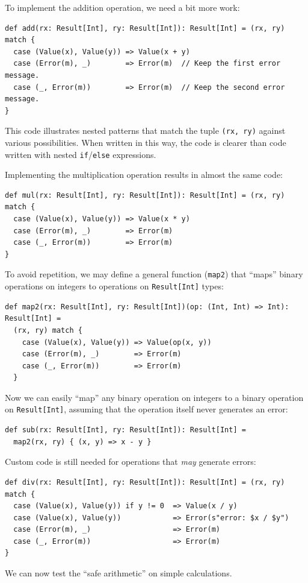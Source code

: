 To implement the addition operation, we need a bit more work:
\begin{lstlisting}
def add(rx: Result[Int], ry: Result[Int]): Result[Int] = (rx, ry) match {
  case (Value(x), Value(y)) => Value(x + y)
  case (Error(m), _)        => Error(m)  // Keep the first error message.
  case (_, Error(m))        => Error(m)  // Keep the second error message.
}
\end{lstlisting}
This code illustrates nested patterns that match the tuple \lstinline!(rx, ry)!
against various possibilities. When written in this way, the code
is clearer than code written with nested \lstinline!if!/\lstinline!else!
expressions.

Implementing the multiplication operation results in almost the same
code:
\begin{lstlisting}
def mul(rx: Result[Int], ry: Result[Int]): Result[Int] = (rx, ry) match {
  case (Value(x), Value(y)) => Value(x * y)
  case (Error(m), _)        => Error(m)
  case (_, Error(m))        => Error(m)
}
\end{lstlisting}
To avoid repetition, we may define a general function (\lstinline!map2!)
that \textsf{``}maps\textsf{''} binary operations on integers to operations on \lstinline!Result[Int]!
types:
\begin{lstlisting}
def map2(rx: Result[Int], ry: Result[Int])(op: (Int, Int) => Int): Result[Int] =
  (rx, ry) match {
    case (Value(x), Value(y)) => Value(op(x, y))
    case (Error(m), _)        => Error(m)
    case (_, Error(m))        => Error(m)
  }
\end{lstlisting}
Now we can easily \textsf{``}map\textsf{''} any binary operation on integers to a
binary operation on \lstinline!Result[Int]!, assuming that the operation
itself never generates an error:
\begin{lstlisting}
def sub(rx: Result[Int], ry: Result[Int]): Result[Int] =
  map2(rx, ry) { (x, y) => x - y }
\end{lstlisting}
 Custom code is still needed for operations that \emph{may} generate
errors:
\begin{lstlisting}
def div(rx: Result[Int], ry: Result[Int]): Result[Int] = (rx, ry) match {
  case (Value(x), Value(y)) if y != 0  => Value(x / y)
  case (Value(x), Value(y))            => Error(s"error: $x / $y")
  case (Error(m), _)                   => Error(m)
  case (_, Error(m))                   => Error(m)
}
\end{lstlisting}
We can now test the \textsf{``}safe arithmetic\textsf{''} on simple calculations.
